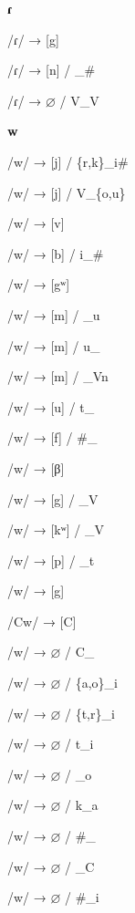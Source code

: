 \begin{center}\textbf{ɾ}\end{center}
\begin{multicols}{4}
\noindent /ɾ/ → [g]

\noindent /ɾ/ → [n] / \_\#

\noindent /ɾ/ → $\varnothing$ / V\_V
\end{multicols}


\begin{center}\textbf{w}\end{center}
\begin{multicols}{4}
\noindent /w/ → [j] / \{r,k\}\_i\#

\noindent /w/ → [j] / V\_\{o,u\}

\noindent /w/ → [v]

\noindent /w/ → [b] / i\_\#

\noindent /w/ → [gʷ]

\noindent /w/ → [m] / \_u

\noindent /w/ → [m] / u\_

\noindent /w/ → [m] / \_Vn

\noindent /w/ → [u] / t\_

\noindent /w/ → [f] / \#\_

\noindent /w/ → [β]

\noindent /w/ → [g] / \_V

\noindent /w/ → [kʷ] / \_V

\noindent /w/ → [p] / \_t

\noindent /w/ → [g]

\noindent /Cw/ → [C]

\noindent /w/ → $\varnothing$ / C\_

\noindent /w/ → $\varnothing$ / \{a,o\}\_i

\noindent /w/ → $\varnothing$ / \{t,r\}\_i

\noindent /w/ → $\varnothing$ / t\_i

\noindent /w/ → $\varnothing$ / \_o

\noindent /w/ → $\varnothing$ / k\_a

\noindent /w/ → $\varnothing$ / \#\_

\noindent /w/ → $\varnothing$ / \_C

\noindent /w/ → $\varnothing$ / \#\_i
\end{multicols}


